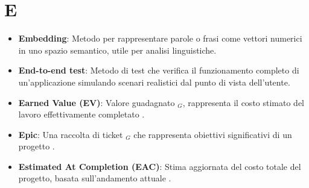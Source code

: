 \section{E}
\begin{itemize}
    \item \textbf{Embedding}: Metodo per rappresentare parole o frasi come vettori numerici in uno spazio semantico, utile per analisi linguistiche.
    \item \textbf{End-to-end test}: Metodo di test che verifica il funzionamento completo di un'applicazione simulando scenari realistici dal punto di vista dell'utente.
    \item \textbf{Earned Value (EV)}: Valore guadagnato $_G$, rappresenta il costo stimato del lavoro effettivamente completato
. \item \textbf{Epic}: Una raccolta di ticket $_G$ che rappresenta obiettivi significativi di un progetto
. \item \textbf{Estimated At Completion (EAC)}: Stima aggiornata del costo totale del progetto, basata sull'andamento attuale
.
\end{itemize}
